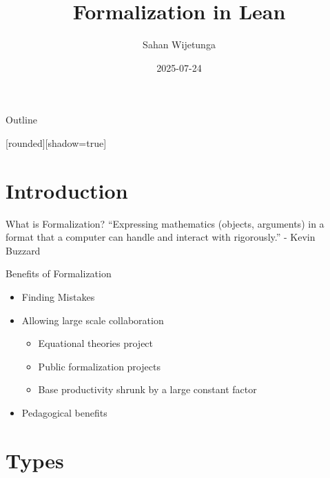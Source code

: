 \documentclass[svgnames]{beamer}
\author{Sahan Wijetunga}
\date{2025-07-24}
\title{Formalization in Lean}
\begin{document}
\maketitle
\begin{frame}{Outline}
\tableofcontents
\end{frame}

[rounded][shadow=true]


\section{Introduction}
\begin{frame}{What is Formalization?}
\centering
``Expressing mathematics (objects, arguments) in a format that a computer can handle and interact with rigorously.'' - Kevin Buzzard
\end{frame}

\begin{frame}{Benefits of Formalization}
\centering
\begin{itemize}
    \item Finding Mistakes
    \item Allowing large scale collaboration
    \begin{itemize}
            \item Equational theories project
        \item Public formalization projects
        \item Base productivity shrunk by a large constant factor
    \end{itemize}
    \item Pedagogical benefits 
\end{itemize}
\end{frame}

\section{Types}
\end{document}
